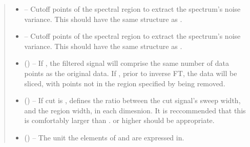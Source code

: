 \documentclass[letterpaper,10pt,english]{sphinxmanual}
\begin{document}
\begin{fulllineitems}
\begin{fulllineitems}
\begin{quote}
\begin{description}
\begin{itemize}
\item {} 
\sphinxAtStartPar
\sphinxstyleliteralstrong{\sphinxupquote{{[}}} – Cut\sphinxhyphen{}off points of the spectral region to extract the spectrum’s
noise variance. This should have the same structure as .

\item {} 
\sphinxAtStartPar
{}\sphinxstyleliteralstrong{\sphinxupquote{{]}}}\sphinxstyleliteralstrong{\sphinxupquote{{]}}} – Cut\sphinxhyphen{}off points of the spectral region to extract the spectrum’s
noise variance. This should have the same structure as .

\item {} 
\sphinxAtStartPar
{} (\sphinxstyleliteralemphasis{\sphinxupquote{, }}) – If , the filtered signal will comprise the same number of
data points as the original data. If , prior to inverse
FT, the data will be sliced, with points not in the region
specified by  being removed.

\item {} 
\sphinxAtStartPar
{} (\sphinxstyleliteralemphasis{\sphinxupquote{, }}) – If cut is , defines the ratio between the cut signal’s sweep
width, and the region width, in each dimesnion.
It is reccommended that this is comfortably larger than .
 or higher should be appropriate.

\item {} 
\sphinxAtStartPar
{} (\sphinxstyleliteralemphasis{\sphinxupquote{, }}\sphinxstyleliteralemphasis{\sphinxupquote{, }}) – The unit the elements of  and  are
expressed in.

\end{itemize}


\end{description}
\end{quote}
\end{fulllineitems}
\end{fulllineitems}
\end{document}
